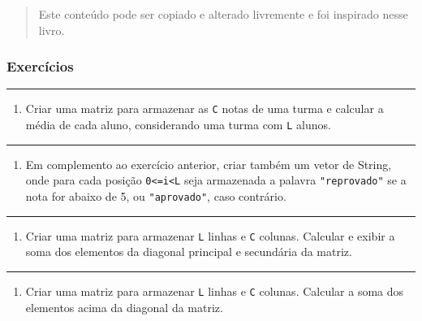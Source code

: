 \documentclass[12pt,a4paper]{article}
\providecommand{\tightlist}{%
      \setlength{\itemsep}{0pt}\setlength{\parskip}{0pt}}
\begin{document}
\begin{quote}
Este conteúdo pode ser copiado e alterado livremente e foi inspirado
nesse livro.
\end{quote}

    \hypertarget{exercuxedcios}{%
\subsubsection{Exercícios}\label{exercuxedcios}}

    \begin{center}\rule{0.5\linewidth}{0.5pt}\end{center}

\begin{enumerate}
\def\labelenumi{\arabic{enumi}.}
\tightlist
\item
  Criar uma matriz para armazenar as \texttt{C} notas de uma turma e
  calcular a média de cada aluno, considerando uma turma com \texttt{L}
  alunos.
\end{enumerate}

    \begin{center}\rule{0.5\linewidth}{0.5pt}\end{center}

\begin{enumerate}
\def\labelenumi{\arabic{enumi}.}
\setcounter{enumi}{1}
\tightlist
\item
  Em complemento ao exercício anterior, criar também um vetor de String,
  onde para cada posição \texttt{0\textless{}=i\textless{}L} seja
  armazenada a palavra \texttt{"reprovado"} se a nota for abaixo de 5,
  ou \texttt{"aprovado"}, caso contrário.
\end{enumerate}

    \begin{center}\rule{0.5\linewidth}{0.5pt}\end{center}

\begin{enumerate}
\def\labelenumi{\arabic{enumi}.}
\setcounter{enumi}{2}
\tightlist
\item
  Criar uma matriz para armazenar \texttt{L} linhas e \texttt{C}
  colunas. Calcular e exibir a soma dos elementos da diagonal principal
  e secundária da matriz.
\end{enumerate}

    \begin{center}\rule{0.5\linewidth}{0.5pt}\end{center}

\begin{enumerate}
\def\labelenumi{\arabic{enumi}.}
\setcounter{enumi}{3}
\tightlist
\item
  Criar uma matriz para armazenar \texttt{L} linhas e \texttt{C}
  colunas. Calcular a soma dos elementos acima da diagonal da matriz.
\end{enumerate}
\end{document}
